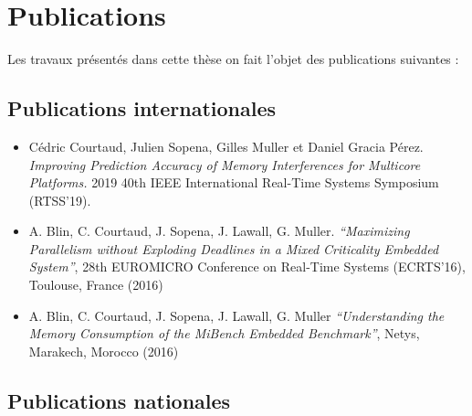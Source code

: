 
\chapter*{Publications}






Les travaux présentés dans cette thèse on fait l'objet des publications suivantes : 

\section*{Publications internationales}

\begin{itemize}
	\item Cédric Courtaud, Julien Sopena, Gilles Muller et Daniel Gracia Pérez. \textit{Improving Prediction Accuracy of Memory Interferences for Multicore Platforms.} 2019 40th IEEE International Real-Time Systems Symposium (RTSS'19).

	\item A. Blin, C. Courtaud, J. Sopena, J. Lawall, G. Muller. \textit{“Maximizing Parallelism without Exploding Deadlines in a Mixed Criticality Embedded System”}, 28th EUROMICRO Conference on Real-Time Systems (ECRTS'16), Toulouse, France (2016)

	\item A. Blin, C. Courtaud, J. Sopena, J. Lawall, G. Muller \textit{“Understanding the Memory Consumption of the MiBench Embedded Benchmark”}, Netys, Marakech, Morocco (2016)

\end{itemize}

\section*{Publications nationales}

